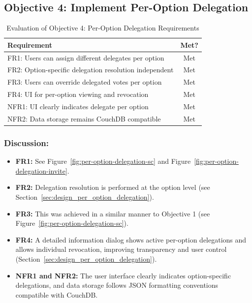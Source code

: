 \subsection{Objective 4: Implement Per-Option Delegation}

\begin{table}[H]
\centering
\begin{tabular}{|p{9cm}|c|}
\hline
\textbf{Requirement} & \textbf{Met?} \\ \hline
FR1: Users can assign different delegates per option & Met \\ \hline
FR2: Option-specific delegation resolution independent & Met \\ \hline
FR3: Users can override delegated votes per option & Met \\ \hline
FR4: UI for per-option viewing and revocation & Met \\ \hline
NFR1: UI clearly indicates delegate per option & Met \\ \hline
NFR2: Data storage remains CouchDB compatible & Met \\ \hline
\end{tabular}
\caption{Evaluation of Objective 4: Per-Option Delegation Requirements}
\label{tab:objective4_requirements}
\end{table}

\subsubsection{Discussion:}

\begin{itemize}
    \item \textbf{FR1:} See Figure~\ref{fig:per-option-delegation-sc} and Figure~\ref{fig:per-option-delegation-invite}.
    \item \textbf{FR2:} Delegation resolution is performed at the option level (see Section~\ref{sec:design_per_option_delegation}).
    \item \textbf{FR3:} This was achieved in a similar manner to Objective 1 (see Figure~\ref{fig:per-option-delegation-sc}).
    \item \textbf{FR4:} A detailed information dialog shows active per-option delegations and allows individual revocation, improving transparency and user control (Section~\ref{sec:design_per_option_delegation}).
    \item \textbf{NFR1 and NFR2:} The user interface clearly indicates option-specific delegations, and data storage follows JSON formatting conventions compatible with CouchDB.
\end{itemize}

